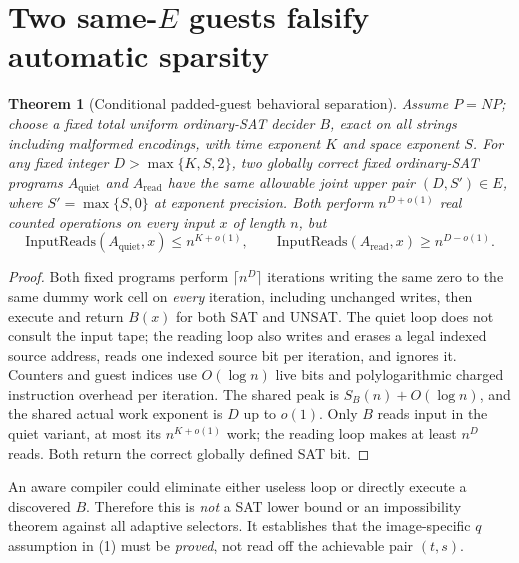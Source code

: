 \documentclass[11pt]{article}
\newtheorem{theorem}{Theorem}
\begin{document}
\section{Two same-$E$ guests falsify automatic sparsity}
\begin{theorem}[Conditional padded-guest behavioral separation]
Assume $P=NP$; choose a \emph{fixed} total uniform
ordinary-SAT decider $B$, exact on all strings including malformed
encodings, with time exponent $K$ and space exponent $S$.
For any fixed integer $D>\max\{K,S,2\}$, two globally correct
fixed ordinary-SAT programs $A_{\mathrm{quiet}}$ and
$A_{\mathrm{read}}$ have the same allowable joint upper
pair $(D,S')\in E$, where $S'=\max\{S,0\}$ at exponent
precision. Both perform $n^{D+o(1)}$ real counted operations
on every input $x$ of length $n$, but
\[
\mathrm{InputReads}(A_{\mathrm{quiet}},x)
\le n^{K+o(1)},\qquad
\mathrm{InputReads}(A_{\mathrm{read}},x)
\ge n^{D-o(1)}. \tag{2}
\]
\end{theorem}
\begin{proof}
Both fixed programs perform $\lceil n^D\rceil$ iterations
writing the same zero to the same dummy work cell on
\emph{every} iteration, including unchanged writes, then
execute and return $B(x)$ for both SAT and UNSAT.
The quiet loop does not consult the input tape; the reading
loop also writes and erases a legal indexed source address,
reads one indexed source bit per iteration, and ignores it.
Counters and guest indices use $O(\log n)$ live bits and
polylogarithmic charged instruction overhead per iteration.
The shared peak is $S_B(n)+O(\log n)$, and the shared
actual work exponent is $D$ up to $o(1)$.
Only $B$ reads input in the quiet variant, at most its
$n^{K+o(1)}$ work; the reading loop makes at least $n^D$
reads. Both return the correct globally defined SAT bit.
\end{proof}
An aware compiler could eliminate either useless loop
or directly execute a discovered $B$. Therefore this is
\emph{not} a SAT lower bound or an impossibility theorem
against all adaptive selectors. It establishes that the
image-specific $q$ assumption in (1) must be \emph{proved},
not read off the achievable pair $(t,s)$.
\end{document}
